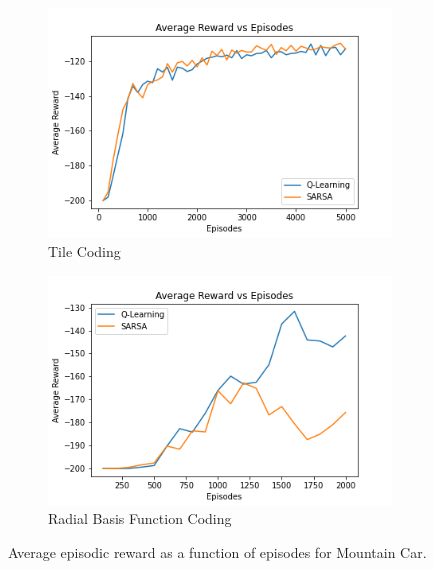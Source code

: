 \documentclass{article}
\begin{document}
        \begin{figure}[H]
            \graphicspath{ {../Experiments/Linear_Function_Approximation/} }
            \centering
            \begin{subfigure}{.5\textwidth}
              \centering
              \includegraphics[width=\linewidth]{Mountaincar_tile.png}
              \caption{Tile Coding}
              \label{mountaincar_tile}
            \end{subfigure}%
            \begin{subfigure}{.5\textwidth}
              \centering
              \includegraphics[width=\linewidth]{Mountaincar_radial.png}
              \caption{Radial Basis Function Coding}
              \label{mountaincar_radial}
            \end{subfigure}
            \caption{Average episodic reward as a function of episodes for Mountain Car.}
            \end{figure}
        
\end{document}
